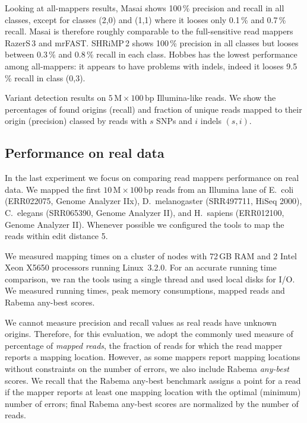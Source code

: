 Looking at all-mappers results, Masai shows 100\,\% precision and recall in all classes, except for classes (2,0) and (1,1) where it looses only 0.1\,\% and 0.7\,\% recall.
Masai is therefore roughly comparable to the full-sensitive read mappers RazerS\,3 and mrFAST.
SHRiMP\,2 shows 100\,\% precision in all classes but looses between 0.3\,\% and 0.8\,\% recall in each class.
Hobbes has the lowest performance among all-mappers: it appears to have problems with indels, indeed it looses 9.5\,\% recall in class (0,3).

\begin{table*}[tH!]
  \caption[Masai variant detection results]
  {
  \label{tab:Variant}
    Variant detection results on $5\,\text{M}\times 100\,\text{bp}$ Illumina-like reads.
    We show the percentages of found origins (recall) and fraction of unique reads mapped to their origin (precision) classed by reads with $s$ SNPs and $i$ indels $(s,i)$.
  }
  \vspace{-3mm}
  \center
  \sffamily
  \resizebox{0.8\textwidth}{!}
  {
	\renewcommand{\tabcolsep}{0.8ex}
	
  }
\end{table*}

\subsection{Performance on real data}

In the last experiment we focus on comparing read mappers performance on real data.
We mapped the first $10\,\text{M}\times 100\,\text{bp}$ reads from an Illumina lane of E.~coli (ERR022075, Genome Analyzer IIx), D.~melanogaster (SRR497711, HiSeq 2000), C.~elegans (SRR065390, Genome Analyzer II), and H.~sapiens (ERR012100, Genome Analyzer II).
Whenever possible we configured the tools to map the reads within edit distance 5.

We measured mapping times on a cluster of nodes with 72\,GB RAM and 2 Intel Xeon X5650 processors running Linux~3.2.0.
For an accurate running time comparison, we ran the tools using a single thread and used local disks for I/O.
We measured running times, peak memory consumptions, mapped reads and Rabema any-best scores.

We cannot measure precision and recall values as real reads have unknown origins.
Therefore, for this evaluation, we adopt the commonly used measure of percentage of \emph{mapped reads}, \ie the fraction of reads for which the read mapper reports a mapping location.
However, as some mappers report mapping locations without constraints on the number of errors, we also include Rabema \emph{any-best} scores.
We recall that the Rabema any-best benchmark assigns a point for a read if the mapper reports at least one mapping location with the optimal (minimum) number of errors;
final Rabema any-best scores are normalized by the number of reads.

